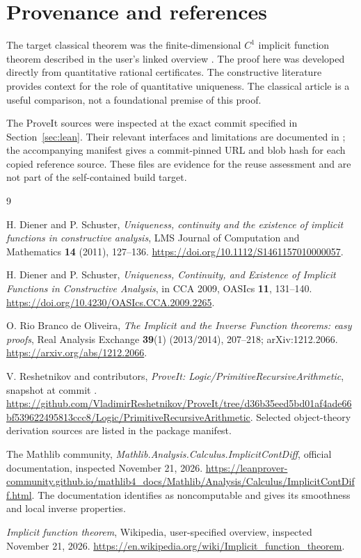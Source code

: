 \section{Provenance and references}

The target classical theorem was the finite-dimensional
\(C^1\) implicit function theorem described in the user's
linked overview \cite{wikipedia}. The proof here was
developed directly from quantitative rational certificates.
The constructive literature \cite{diener2011,diener2009}
provides context for the role of quantitative uniqueness.
The classical article \cite{oliveira} is a useful
comparison, not a foundational premise of this proof.

The ProveIt sources were inspected at the exact commit
specified in Section~\ref{sec:lean}. Their relevant
interfaces and limitations are documented in
; the accompanying
manifest gives a commit-pinned URL and blob hash for
each copied reference source. These files are evidence
for the reuse assessment and are not part of the
self-contained  build target.

\begingroup
\raggedright
\begin{thebibliography}{9}

H. Diener and P. Schuster,
\emph{Uniqueness, continuity and the existence of implicit
functions in constructive analysis},
LMS Journal of Computation and Mathematics \textbf{14}
(2011), 127--136.
\url{https://doi.org/10.1112/S1461157010000057}.

H. Diener and P. Schuster,
\emph{Uniqueness, Continuity, and Existence of Implicit
Functions in Constructive Analysis},
in CCA 2009, OASIcs \textbf{11}, 131--140.
\url{https://doi.org/10.4230/OASIcs.CCA.2009.2265}.

O. Rio Branco de Oliveira,
\emph{The Implicit and the Inverse Function theorems:
easy proofs},
Real Analysis Exchange \textbf{39}(1) (2013/2014),
207--218; arXiv:1212.2066.
\url{https://arxiv.org/abs/1212.2066}.

V. Reshetnikov and contributors,
\emph{ProveIt: Logic/PrimitiveRecursiveArithmetic},
snapshot at commit
.
\url{https://github.com/VladimirReshetnikov/ProveIt/tree/d36b35eed5bd01af4ade66bf539622495813ccc8/Logic/PrimitiveRecursiveArithmetic}.
Selected object-theory derivation sources are listed
in the package manifest.

The Mathlib community,
\emph{Mathlib.Analysis.Calculus.ImplicitContDiff},
official documentation, inspected November 21, 2026.
\url{https://leanprover-community.github.io/mathlib4_docs/Mathlib/Analysis/Calculus/ImplicitContDiff.html}.
The documentation identifies
 as noncomputable
and gives its smoothness and local inverse properties.

\emph{Implicit function theorem},
Wikipedia, user-specified overview, inspected
November 21, 2026.
\url{https://en.wikipedia.org/wiki/Implicit_function_theorem}.

\end{thebibliography}
\endgroup
